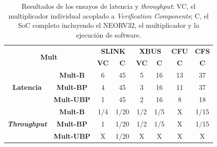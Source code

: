 \begin{table}[H]
\centering
\caption{Resultados de los ensayos de latencia y \textit{throughput}: VC, el multiplicador individual acoplado a \textit{Verification Components}; C, el SoC completo incluyendo el NEORV32, el multiplicador y la ejecución de software.}
\label{tab:4}
\begin{tabular}{|cc|cc|cc|c|c|}
\hline
\multicolumn{2}{|c|}{\multirow{2}{*}{\textbf{Mult}}}                                    & \multicolumn{2}{c|}{\textbf{SLINK}}           & \multicolumn{2}{c|}{\textbf{XBUS}}            & \textbf{CFU} & \textbf{CFS} \\ \cline{3-8} 
\multicolumn{2}{|c|}{}                                                                  & \multicolumn{1}{c|}{\textbf{VC}} & \textbf{C} & \multicolumn{1}{c|}{\textbf{VC}} & \textbf{C} & \textbf{C}   & \textbf{C}   \\ \hline
\multicolumn{1}{|c|}{\multirow{3}{*}{\textbf{Latencia}}}            & \textbf{Mult-B}   & \multicolumn{1}{c|}{6}           & 45         & \multicolumn{1}{c|}{5}           & 16         & 13           & 37           \\ \cline{2-8} 
\multicolumn{1}{|c|}{}                                              & \textbf{Mult-BP}  & \multicolumn{1}{c|}{4}           & 45         & \multicolumn{1}{c|}{3}           & 16         & 11           & 37           \\ \cline{2-8} 
\multicolumn{1}{|c|}{}                                              & \textbf{Mult-UBP} & \multicolumn{1}{c|}{1}           & 45         & \multicolumn{1}{c|}{2}           & 16         & 8            & 18           \\ \hline
\multicolumn{1}{|c|}{\multirow{3}{*}{\textit{\textbf{Throughput}}}} & \textbf{Mult-B}   & \multicolumn{1}{c|}{1/4}         & 1/20       & \multicolumn{1}{c|}{1/2}         & 1/5        & X            & 1/15         \\ \cline{2-8} 
\multicolumn{1}{|c|}{}                                              & \textbf{Mult-BP}  & \multicolumn{1}{c|}{1}           & 1/20       & \multicolumn{1}{c|}{1/2}         & 1/5        & X            & 1/15         \\ \cline{2-8} 
\multicolumn{1}{|c|}{}                                              & \textbf{Mult-UBP} & \multicolumn{1}{c|}{X}           & 1/20       & \multicolumn{1}{c|}{X}           & X          & X            & X            \\ \hline
\end{tabular}
\end{table}

